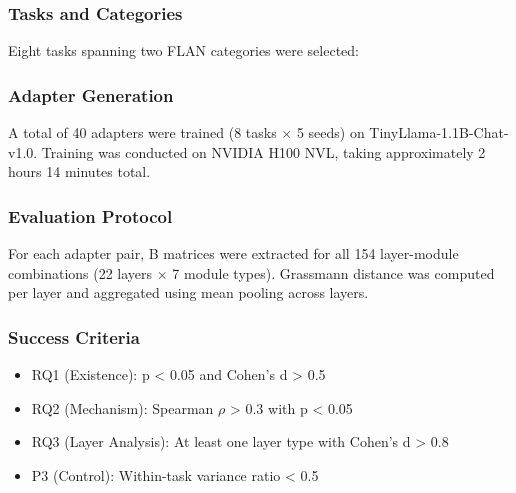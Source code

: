 
\subsubsection{Tasks and Categories}

Eight tasks spanning two FLAN categories were selected:

\begin{table}[htbp]
\centering
{}
\end{table}

\subsubsection{Adapter Generation}

A total of 40 adapters were trained (8 tasks $\times$ 5 seeds) on TinyLlama-1.1B-Chat-v1.0. Training was conducted on NVIDIA H100 NVL, taking approximately 2 hours 14 minutes total.

\subsubsection{Evaluation Protocol}

For each adapter pair, B matrices were extracted for all 154 layer-module combinations (22 layers $\times$ 7 module types). Grassmann distance was computed per layer and aggregated using mean pooling across layers.

\subsubsection{Success Criteria}

\begin{itemize}
\item RQ1 (Existence): p < 0.05 and Cohen's d > 0.5
\item RQ2 (Mechanism): Spearman $\rho$ > 0.3 with p < 0.05
\item RQ3 (Layer Analysis): At least one layer type with Cohen's d > 0.8
\item P3 (Control): Within-task variance ratio < 0.5
\end{itemize}
